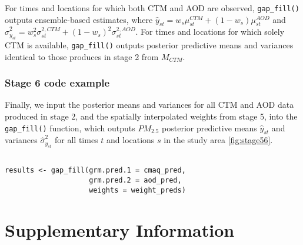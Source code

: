 \documentclass[12pt]{article}
\begin{document}
For times and locations for which both CTM and AOD are observed, \texttt{gap\_fill()} outputs ensemble-based estimates, where $\hat{y}_{st} = w_s \mu^{CTM}_{st} + (1 - w_s)\mu^{AOD}_{st}$ and $\hat{\sigma}^2_{y_{st}} = w^2_s \sigma^{2, CTM}_{st} + (1 - w_s)^2 \sigma^{2, AOD}_{st}$. 
For times and locations for which solely CTM is available, \texttt{gap\_fill()} outputs posterior predictive means and variances identical to those produces in stage 2 from $M_{CTM}$. 




\subsubsection*{Stage 6 code example}

Finally, we input the posterior means and variances for all CTM and AOD data produced in stage 2, and the spatially interpolated weights from stage 5, into the \texttt{gap\_fill()} function, which outputs $PM_{2.5}$ posterior predictive means $\hat{y}_{st}$ and variances $\hat{\sigma}^{2}_{y_{st}}$ for all times $t$ and locations $s$ in the study area \ref{fig:stage56}.



\begin{lstlisting}

results <- gap_fill(grm.pred.1 = cmaq_pred,
                    grm.pred.2 = aod_pred,
                    weights = weight_preds)

\end{lstlisting}






\section*{Supplementary Information}





\printbibliography
\end{document}
